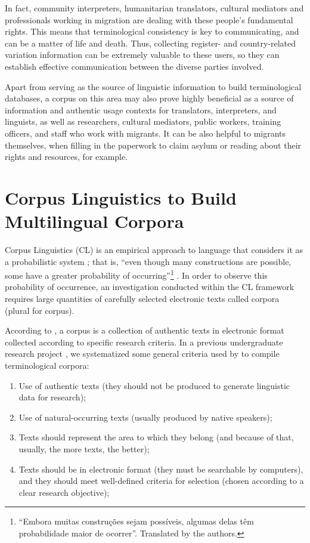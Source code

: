 \documentclass[english]{textolivre}
\begin{document}
In fact, community interpreters, humanitarian translators, cultural mediators and professionals working in migration are dealing with these people’s fundamental rights. This means that terminological consistency is key to communicating, and can be a matter of life and death. Thus, collecting register- and country-related variation information can be extremely valuable to these users, so they can establish effective communication between the diverse parties involved.

Apart from serving as the source of linguistic information to build terminological databases, a corpus on this area may also prove highly beneficial as a source of information and authentic usage contexts for translators, interpreters, and linguists, as well as researchers, cultural mediators, public workers, training officers, and staff who work with migrants. It can be also helpful to migrants themselves, when filling in the paperwork to claim asylum or reading about their rights and resources, for example.

\section{Corpus Linguistics to Build Multilingual Corpora}\label{sec-modelo}

Corpus Linguistics (CL) is an empirical approach to language that considers it as a probabilistic system \cites{johns_micro-concord:_1986, aijmer_english_1991,svartvik_language_1992}[p.~30]{sardinha_linguistica_2004}; that is, “even though many constructions are possible, some have a greater probability of occurring”\footnote{“Embora muitas construções sejam possíveis, algumas delas têm probabilidade maior de ocorrer”. Translated by the authors.} \cite[p.~20]{tagnin_corpora_2015}. In order to observe this probability of occurrence, an investigation conducted within the CL framework requires large quantities of carefully selected electronic texts called corpora (plural for corpus).  

According to \textcite{bowker_working_2002}, a corpus is a collection of authentic texts in electronic format collected according to specific research criteria. In a previous undergraduate research project \cite{furtado_compilacao_2019}, we systematized some general criteria used by \textcite{bowker_working_2002,teixeira_linguistica_2008} to compile terminological corpora:

\begin{enumerate}[label=\alph*)]
\item Use of authentic texts (they should not be produced to generate linguistic data for research); 
\item Use of natural-occurring texts (usually produced by native speakers); 
\item Texts should represent the area to which they belong (and because of that, usually, the more texts, the better); 
\item Texts should be in electronic format (they must be searchable by computers), and they should meet well-defined criteria for selection (chosen according to a clear research objective);
\end{enumerate}
\end{document}

